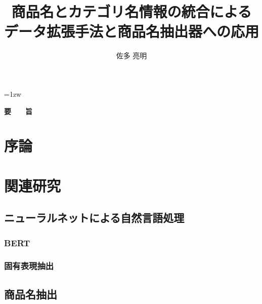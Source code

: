 \documentclass[a4paper,11pt]{jreport}
\title{商品名とカテゴリ名情報の統合による\\
データ拡張手法と商品名抽出器への応用}
\author{佐多 亮明}
\begin{document}
\maketitle
\thispagestyle{empty}
\newpage

\thispagestyle{empty}
\vspace*{20pt plus 1fil}
\parindent=1zw
\noindent
\begin{center}
{\Large \bf 要　　旨}
\vspace{2cm}
\end{center}


\par
\vspace{0pt plus 1fil}
\newpage

\tableofcontents
\listoffigures

\pagebreak \setcounter{page}{1}










\chapter{序論}








\chapter{関連研究}

\section{ニューラルネットによる自然言語処理}

\subsection{BERT}


\subsection{固有表現抽出}


\newpage
\section{商品名抽出}
\end{document}
